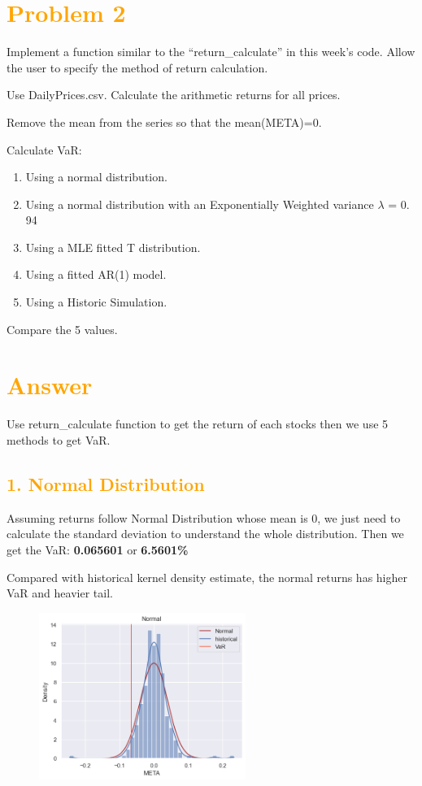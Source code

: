 \documentclass[11pt,en]{elegantpaper}
\begin{document}
\newpage
\section*{\textcolor{orange}{Problem 2}}

Implement a function similar to the “return\_calculate\(\)” in this week's code. Allow the user to specify the method of return calculation.

Use DailyPrices.csv. Calculate the arithmetic returns for all prices.

Remove the mean from the series so that the mean(META)=0.

Calculate VaR:
\begin{enumerate}
    \item Using a normal distribution.
    \item Using a normal distribution with an Exponentially Weighted variance $\lambda$ = 0. 94
    \item Using a MLE fitted T distribution.
    \item Using a fitted AR(1) model.
    \item Using a Historic Simulation.
\end{enumerate}

Compare the 5 values.

\section*{\textcolor{orange}{Answer}}

Use return\_calculate function to get the return of each stocks then we use 5 methods to get VaR.

\subsection*{\textcolor{orange}{1. Normal Distribution}}

Assuming returns follow Normal Distribution whose mean is 0, we just need to calculate the standard deviation to understand the whole distribution. Then we get the VaR: \textbf{0.065601} or \textbf{6.5601\%} 

Compared with historical kernel density estimate, the normal returns has higher VaR and heavier tail.
\begin{figure}[htbp] 
    \centering 
    \includegraphics[width=0.6\textwidth]{./image/Normal.png} 
\end{figure}
\end{document}

